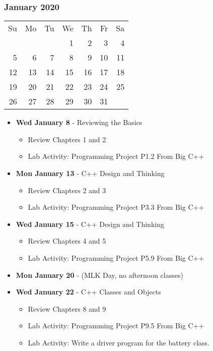 \subsubsection*{January 2020}
\begin{tabular}{rrrrrrr}
Su & Mo & Tu & We & Th & Fr & Sa\\
   &    &    &  1 &  2 &  3 &  4\\ 
 5 &  6 &  7 &  8 &  9 & 10 & 11\\ 
12 & 13 & 14 & 15 & 16 & 17 & 18\\ 
19 & 20 & 21 & 22 & 23 & 24 & 25\\ 
26 & 27 & 28 & 29 & 30 & 31 &\\
\end{tabular}
\begin{itemize}
\item\textbf{Wed January  8} - Reviewing the Basics
    \begin{itemize}
        \item Review Chapters 1 and 2
        \item Lab Activity: Programming Project P1.2 From Big C++
    \end{itemize}
\item\textbf{Mon January 13} - C++ Design and Thinking
    \begin{itemize}
        \item Review Chapters 2 and 3
        \item Lab Activity: Programming Project P3.3 From Big C++
    \end{itemize}
\item\textbf{Wed January 15} - C++ Design and Thinking
    \begin{itemize}
        \item Review Chapters 4 and 5
        \item Lab Activity: Programming Project P5.9 From Big C++
    \end{itemize}
\item\textbf{Mon January 20} - (MLK Day, no afternoon classes)
\item\textbf{Wed January 22} - C++ Classes and Objects
    \begin{itemize}
        \item Review Chapters 8 and 9
        \item Lab Activity: Programming Project P9.5 From Big C++
        \item Lab Activity: Write a driver program for the battery
            class.
    \end{itemize}

\end{itemize}
